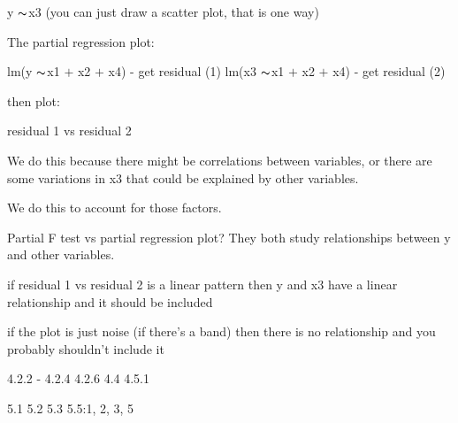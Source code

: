 \documentclass[12pt]{extarticle}
\newcommand{\mt}[1]{\ensuremath{#1}}
\newcommand{\ps}{\mt{\operatorname{+}} }
\newcommand{\tl}{\mt{\thicksim}}
\begin{document}
y \tl x3 (you can just draw a scatter plot, that is one way)

The partial regression plot:

lm(y \tl x1 \ps x2 \ps x4) - get residual (1)
lm(x3 \tl x1 \ps x2 \ps x4) - get residual (2)

then plot:

residual 1 vs residual 2

We do this because there might be correlations between variables, or there are some variations in x3 that could be explained by other variables.

We do this to account for those factors.

Partial F test vs partial regression plot? They both study relationships between y and other variables.

if residual 1 vs residual 2 is a linear pattern then y and x3 have a linear relationship and it should be included

if the plot is just noise (if there's a band) then there is no relationship and you probably shouldn't include it

4.2.2 - 4.2.4
4.2.6
4.4
4.5.1

5.1
5.2
5.3
5.5:1, 2, 3, 5
\end{document}
